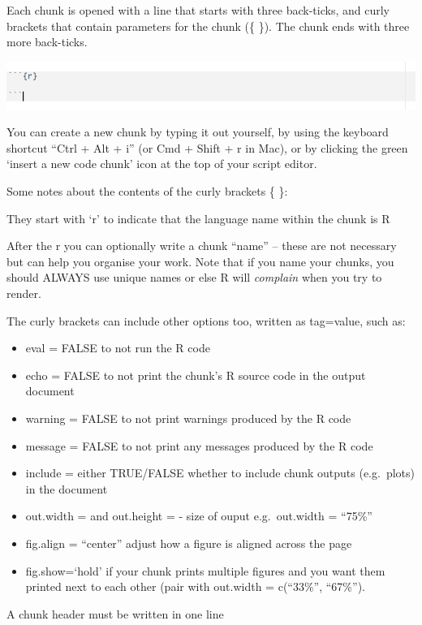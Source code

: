 \documentclass[
]{book}
\begin{document}
Each chunk is opened with a line that starts with three back-ticks, and curly brackets that contain parameters for the chunk (\{ \}). The chunk ends with three more back-ticks.

\includegraphics[width=0.8\linewidth]{images/chunk}

You can create a new chunk by typing it out yourself, by using the keyboard shortcut ``Ctrl + Alt + i'' (or Cmd + Shift + r in Mac), or by clicking the green `insert a new code chunk' icon at the top of your script editor.

Some notes about the contents of the curly brackets \{ \}:

They start with `r' to indicate that the language name within the chunk is R

After the r you can optionally write a chunk ``name'' -- these are not necessary but can help you organise your work. Note that if you name your chunks, you should ALWAYS use unique names or else R will \emph{complain} when you try to render.

The curly brackets can include other options too, written as tag=value, such as:

\begin{itemize}
\item
  eval = FALSE to not run the R code
\item
  echo = FALSE to not print the chunk's R source code in the output document
\item
  warning = FALSE to not print warnings produced by the R code
\item
  message = FALSE to not print any messages produced by the R code
\item
  include = either TRUE/FALSE whether to include chunk outputs (e.g.~plots) in the document
\item
  out.width = and out.height = - size of ouput e.g.~out.width = ``75\%''
\item
  fig.align = ``center'' adjust how a figure is aligned across the page
\item
  fig.show=`hold' if your chunk prints multiple figures and you want them printed next to each other (pair with out.width = c(``33\%'', ``67\%'').
\end{itemize}

A chunk header must be written in one line
\end{document}

